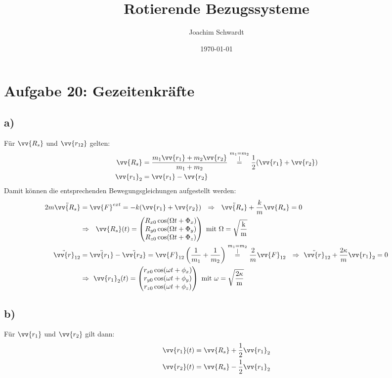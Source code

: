 \documentclass[a4paper,12pt]{article}
\begin{document}
\title{Rotierende Bezugssysteme}
\author{Joachim Schwardt}
\date{\today}
\maketitle

\section*{Aufgabe 20: Gezeitenkräfte}
\subsection*{a)}
Für $\vv{R_s}$ und $\vv{r_{12}}$ gelten:
\begin{align*}
\vv{R_s}&=\frac{m_1\vv{r_1}+m_2\vv{r_2}}{m_1+m_2}\overset{\substack{ m_1=m_2\\|}}{=} \frac12 (\vv{r_1}+\vv{r_2})\\
\vv{r_1}_2&=\vv{r_1}-\vv{r_2}
\end{align*}
Damit können die entsprechenden Bewegungsgleichungen aufgestellt werden:
\begin{align*}
2m\ddot{\vv{R_s}}&=\vv{F}^{ext}=-k(\vv{r_1}+\vv{r_2})\ \ \Rightarrow\ \ \ddot{\vv{R_s}}+\frac{k}{m}\vv{R_s}=0\\
&\Rightarrow\ \ \vv{R_s}(t)=\begin{pmatrix} R_{x0}\cos(\Omega t+\Phi_x) \\ R_{y0}\cos(\Omega t+\Phi_y) \\ R_{z0}\cos(\Omega t+\Phi_z)  \end{pmatrix}\ \mathrm{mit\ \Omega = \sqrt{\frac{k}{m}}}\\
\ddot{\vv{r}}_{12}&=\ddot{\vv{r_1}}-\ddot{\vv{r_2}}=\vv{F}_{12}\left(\frac{1}{m_1}+\frac{1}{m_2}\right)\overset{\substack{m_1=m_2\\|}}{=}\frac{2}{m}\vv{F}_{12}\ \ \Rightarrow\ \ddot{\vv{r}}_{12}+\frac{2\kappa}{m}\vv{r_1}_2=0\\
&\Rightarrow\ \vv{r_1}_2(t)=\begin{pmatrix} r_{x0}\cos(\omega t +\phi_x) \\ r_{y0}\cos(\omega t +\phi_y) \\r_{z0}\cos(\omega t +\phi_z) \end{pmatrix}\ \mathrm{mit\ \omega = \sqrt{\frac{2\kappa}{m}}}
\end{align*}
\subsection*{b)}
Für $\vv{r_1}$ und $\vv{r_2}$ gilt dann:
\begin{align*}
\vv{r_1}(t)&=\vv{R_s}+\frac12 \vv{r_1}_2\\
\vv{r_2}(t)&=\vv{R_s}-\frac12 \vv{r_1}_2
\end{align*}
\end{document}
